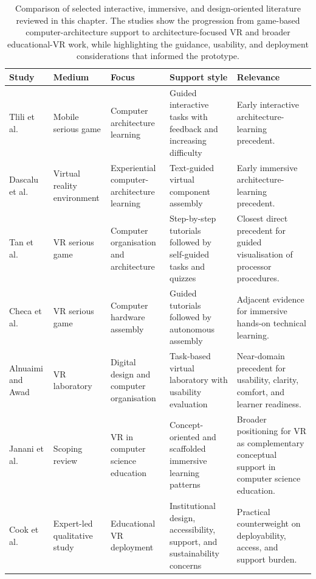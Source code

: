 \begin{table}[!htbp]
\centering
\small
\setlength{\tabcolsep}{3.5pt}
\renewcommand{\arraystretch}{1.12}
\begin{tabularx}{\textwidth}{@{}
    >{\raggedright\arraybackslash}p{2.3cm}
    >{\raggedright\arraybackslash}p{1.6cm}
    >{\raggedright\arraybackslash}p{2.0cm}
    >{\raggedright\arraybackslash}X
    >{\raggedright\arraybackslash}p{3.8cm}
@{}}
\toprule
\textbf{Study} &
\textbf{Medium} &
\textbf{Focus} &
\textbf{Support style} &
\textbf{Relevance} \\
\midrule
Tlili et al. \cite{tlili2016improving} &
Mobile serious game &
Computer architecture learning &
Guided interactive tasks with feedback and increasing difficulty &
Early interactive architecture-learning precedent. \\

Dascalu et al. \cite{dascalu2017experiential} &
Virtual reality environment &
Experiential computer-architecture learning &
Text-guided virtual component assembly &
Early immersive architecture-learning precedent. \\

Tan et al. \cite{tan2023vr} &
VR serious game &
Computer organisation and architecture &
Step-by-step tutorials followed by self-guided tasks and quizzes &
Closest direct precedent for guided visualisation of processor procedures. \\

Checa et al. \cite{checa2023immersive} &
VR serious game &
Computer hardware assembly &
Guided tutorials followed by autonomous assembly &
Adjacent evidence for immersive hands-on technical learning. \\

Alnuaimi and Awad \cite{alnuaimi2025vr} &
VR laboratory &
Digital design and computer organisation &
Task-based virtual laboratory with usability evaluation &
Near-domain precedent for usability, clarity, comfort, and learner readiness. \\

Janani et al. \cite{janani2026virtual} &
Scoping review &
VR in computer science education &
Concept-oriented and scaffolded immersive learning patterns &
Broader positioning for VR as complementary conceptual support in computer science education. \\

Cook et al. \cite{cook2019challenges} &
Expert-led qualitative study &
Educational VR deployment &
Institutional design, accessibility, support, and sustainability concerns &
Practical counterweight on deployability, access, and support burden. \\
\bottomrule
\end{tabularx}
\caption[Comparison of key reviewed literature]{Comparison of selected interactive, immersive, and design-oriented literature reviewed in this chapter. The studies show the progression from game-based computer-architecture support to architecture-focused VR and broader educational-VR work, while highlighting the guidance, usability, and deployment considerations that informed the prototype.}
\label{tab:related-work-comparison}
\end{table}
